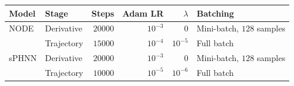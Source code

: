 \begin{tabularx}{\linewidth}{@{}llrrrX@{}}
  \toprule
  Model & Stage & Steps & Adam LR & $\lambda$ & Batching \\
  \midrule
  \Ac{NODE} & Derivative & $20000$ & $10^{-3}$ & $0$ & Mini-batch, $128$ samples \\
       & Trajectory & $15000$ & $10^{-4}$ & $10^{-5}$ & Full batch \\
  \addlinespace
  \Ac{sPHNN} & Derivative & $20000$ & $10^{-3}$ & $0$ & Mini-batch, $128$ samples \\
        & Trajectory & $10000$ & $10^{-5}$ & $10^{-6}$ & Full batch \\
  \bottomrule
\end{tabularx}
